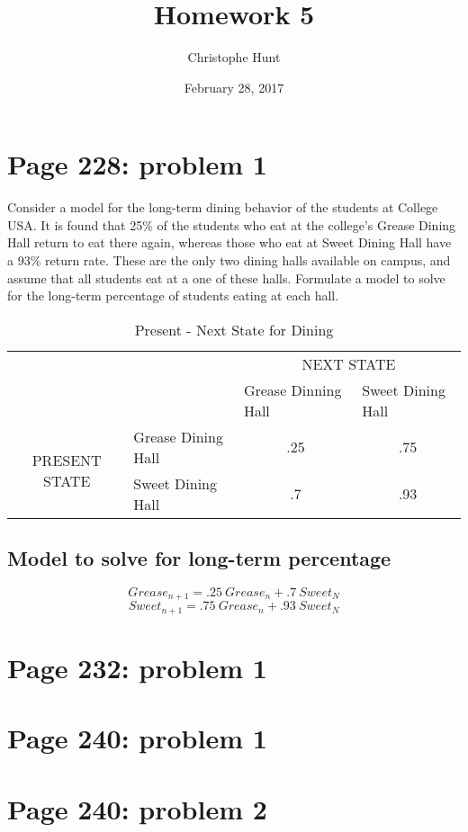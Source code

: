 \documentclass[]{article}
\title{Homework 5}
\author{Christophe Hunt}
\date{February 28, 2017}
\begin{document}
\maketitle

{
\setcounter{tocdepth}{2}
\tableofcontents
}
\newpage

\section{Page 228: problem 1}\label{page-228-problem-1}

Consider a model for the long-term dining behavior of the students at
College USA. It is found that 25\% of the students who eat at the
college's Grease Dining Hall return to eat there again, whereas those
who eat at Sweet Dining Hall have a 93\% return rate. These are the only
two dining halls available on campus, and assume that all students eat
at a one of these halls. Formulate a model to solve for the long-term
percentage of students eating at each hall.

\begin{table}[h]
\centering
\caption{Present - Next State for Dining}
\label{Present - Next State for Dining}
\begin{tabular}{cl|cc|}
\cline{3-4}
 &  & \multicolumn{2}{c|}{NEXT STATE} \\ \cline{3-4} 
\multicolumn{1}{l}{} &  & \multicolumn{1}{l}{Grease Dinning Hall} & \multicolumn{1}{l|}{Sweet Dining Hall} \\ \hline
\multicolumn{1}{|c|}{\multirow{2}{*}{PRESENT STATE}} & Grease Dining Hall & .25 & .75 \\
\multicolumn{1}{|c|}{} & Sweet Dining Hall & .7 & .93 \\ \hline
\end{tabular}
\end{table}

\subsection{Model to solve for long-term
percentage}\label{model-to-solve-for-long-term-percentage}

\[Grease_{n+1} = .25~Grease_n + .7~Sweet_N\]
\[Sweet_{n+1} = .75~Grease_n + .93~Sweet_N\]

\section{Page 232: problem 1}\label{page-232-problem-1}

\section{Page 240: problem 1}\label{page-240-problem-1}

\section{Page 240: problem 2}\label{page-240-problem-2}
\end{document}
